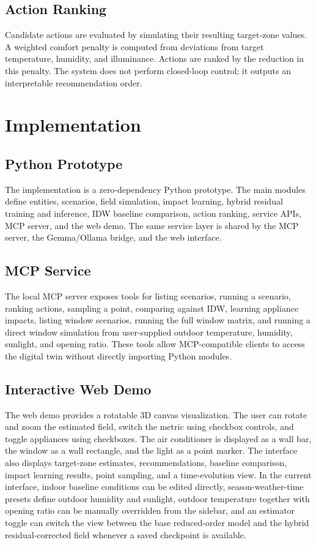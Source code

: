\documentclass[conference]{IEEEtran}
\begin{document}
\subsection{Action Ranking}
Candidate actions are evaluated by simulating their resulting target-zone values. A weighted comfort penalty is computed from deviations from target temperature, humidity, and illuminance. Actions are ranked by the reduction in this penalty. The system does not perform closed-loop control; it outputs an interpretable recommendation order.

\section{Implementation}
\subsection{Python Prototype}
The implementation is a zero-dependency Python prototype. The main modules define entities, scenarios, field simulation, impact learning, hybrid residual training and inference, IDW baseline comparison, action ranking, service APIs, MCP server, and the web demo. The same service layer is shared by the MCP server, the Gemma/Ollama bridge, and the web interface.

\subsection{MCP Service}
The local MCP server exposes tools for listing scenarios, running a scenario, ranking actions, sampling a point, comparing against IDW, learning appliance impacts, listing window scenarios, running the full window matrix, and running a direct window simulation from user-supplied outdoor temperature, humidity, sunlight, and opening ratio. These tools allow MCP-compatible clients to access the digital twin without directly importing Python modules.

\subsection{Interactive Web Demo}
The web demo provides a rotatable 3D canvas visualization. The user can rotate and zoom the estimated field, switch the metric using checkbox controls, and toggle appliances using checkboxes. The air conditioner is displayed as a wall bar, the window as a wall rectangle, and the light as a point marker. The interface also displays target-zone estimates, recommendations, baseline comparison, impact learning results, point sampling, and a time-evolution view. In the current interface, indoor baseline conditions can be edited directly, season-weather-time presets define outdoor humidity and sunlight, outdoor temperature together with opening ratio can be manually overridden from the sidebar, and an estimator toggle can switch the view between the base reduced-order model and the hybrid residual-corrected field whenever a saved checkpoint is available.
\end{document}
